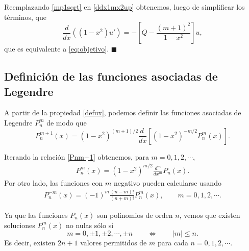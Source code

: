 \begin{scriptsize}
Reemplazando \eqref{mp1sqrt} en \eqref{ddx1mx2up} obtenemos, luego de simplificar los términos, que
\begin{equation}
    \frac{d}{dx}\left((1-x^2)u'\right) = - \left[Q-\frac{(m+1)^2}{1-x^2}\right]u,
\end{equation}
que es equivalente a \eqref{eq:objetivo}. $\blacksquare$
\end{scriptsize}

\subsection{Definición de las funciones asociadas de Legendre}
\begin{tcolorbox}
A partir de la propiedad \eqref{defux}, podemos definir las funciones asociadas de Legendre $P_n^m$ de modo que
\begin{equation}\label{Pnm+1}
P_n^{m+1}(x)=(1-x^2)^{(m+1)/2}\frac{d\ }{dx}\left[(1-x^2)^{-m/2}P_n^m(x)\right].
\end{equation}
\end{tcolorbox}
Iterando la relación \eqref{Pnm+1} obtenemos, para $m=0,1,2,\cdots$, 
\begin{eqnarray}\label{Pnm}
P_n^m(x) =(1-x^2)^{m/2}\frac{d^m}{dx^m} P_n(x).
\end{eqnarray}
Por otro lado, las funciones con $m$ negativo pueden calcularse usando
\begin{eqnarray}
P_n^{-m}(x) = (-1)^m\frac{(n-m)!}{(n+m)!} P_n^m(x), \qquad m=0,1,2,\cdots.
\label{est29}
\end{eqnarray}

Ya que las funciones $P_n(x)$ son polinomios de orden $n$, vemos que existen soluciones $P_n^m(x)$ no nulas sólo si
\begin{equation}
  m=0,\pm 1,\pm 2,\cdots,\pm n \qquad\Leftrightarrow\qquad
  |m|\leq n.
\end{equation}
Es decir, existen $2n+1$ valores permitidos de $m$ para cada $n=0,1,2,\cdots$.

